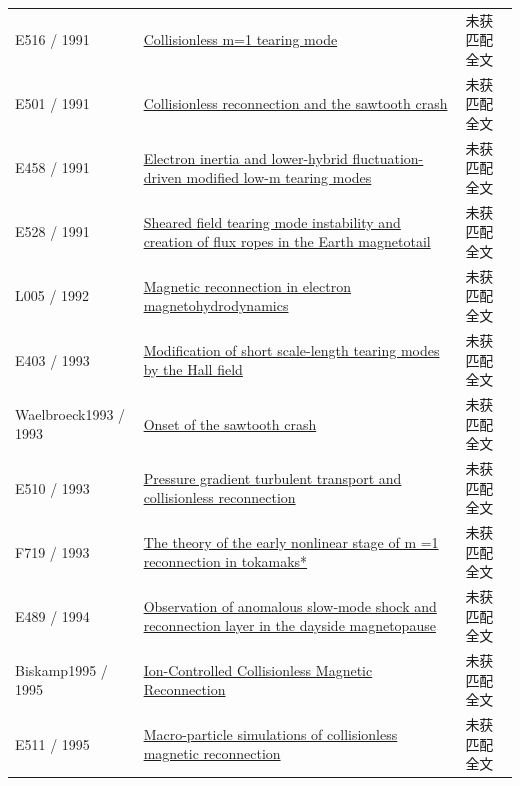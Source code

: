 \begin{longtable}{P{24mm}P{97mm}P{27mm}}
E516 / 1991 & \href{https://doi.org/10.1103/physrevlett.66.425}{Collisionless m=1 tearing mode} & 未获匹配全文\\

E501 / 1991 & \href{https://doi.org/10.1103/physrevlett.66.1458}{Collisionless reconnection and the sawtooth crash} & 未获匹配全文\\

E458 / 1991 & \href{https://doi.org/10.1063/1.859804}{Electron inertia and lower-hybrid fluctuation-driven modified low-m tearing modes} & 未获匹配全文\\

E528 / 1991 & \href{https://doi.org/10.1029/91gl00235}{Sheared field tearing mode instability and creation of flux ropes in the Earth magnetotail} & 未获匹配全文\\

L005 / 1992 & \href{https://doi.org/10.1063/1.860467}{Magnetic reconnection in electron magnetohydrodynamics} & 未获匹配全文\\

E403 / 1993 & \href{https://doi.org/10.1063/1.860880}{Modification of short scale-length tearing modes by the Hall field} & 未获匹配全文\\

Waelbroeck1993 / 1993 & \href{https://doi.org/10.1103/physrevlett.70.3259}{Onset of the sawtooth crash} & 未获匹配全文\\

E510 / 1993 & \href{https://doi.org/10.1088/0741-3335/35/6/009}{Pressure gradient turbulent transport and collisionless reconnection} & 未获匹配全文\\

F719 / 1993 & \href{https://doi.org/10.1063/1.860735}{The theory of the early nonlinear stage of m =1 reconnection in tokamaks*} & 未获匹配全文\\

E489 / 1994 & \href{https://doi.org/10.1029/94ja01767}{Observation of anomalous slow‐mode shock and reconnection layer in the dayside magnetopause} & 未获匹配全文\\

Biskamp1995 / 1995 & \href{https://doi.org/10.1103/physrevlett.75.3850}{Ion-Controlled Collisionless Magnetic Reconnection} & 未获匹配全文\\

E511 / 1995 & \href{https://doi.org/10.1063/1.871192}{Macro-particle simulations of collisionless magnetic reconnection} & 未获匹配全文\\


\end{longtable}

